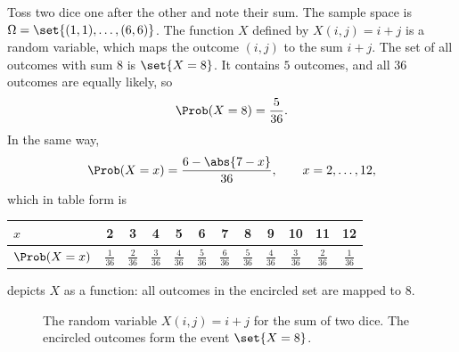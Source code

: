 \begin{example}\label{ex:sum-two-dice}
Toss two dice one after the other and note their sum. The sample space is $\Omega = \set{(1,1), \ldots, (6,6)}$. The function $X$ defined by $X(i, j) = i + j$ is a random variable, which maps the outcome $(i,j)$ to the sum $i + j$. The set of all outcomes with sum $8$ is $\set{X = 8}$. It contains $5$ outcomes, and all $36$ outcomes are equally likely, so
\[
  \Prob(X = 8) = \frac{5}{36}.
\]
In the same way,
\begin{equation}\label{eq:sum-two-dice-pmf}
  \Prob(X = x) = \frac{6 - \abs{7 - x}}{36}, \qquad x = 2, \ldots, 12,
\end{equation}
which in table form is
\begin{center}
\begin{tabular}{@{}l*{11}{c}@{}}
\toprule
$x$ & 2 & 3 & 4 & 5 & 6 & 7 & 8 & 9 & 10 & 11 & 12 \\
\midrule
$\Prob(X = x)$ & $\frac{1}{36}$ & $\frac{2}{36}$ & $\frac{3}{36}$ & $\frac{4}{36}$ & $\frac{5}{36}$ & $\frac{6}{36}$ & $\frac{5}{36}$ & $\frac{4}{36}$ & $\frac{3}{36}$ & $\frac{2}{36}$ & $\frac{1}{36}$ \\
\bottomrule
\end{tabular}
\end{center}
 depicts $X$ as a function: all outcomes in the encircled set are mapped to 8.
\end{example}

\begin{figure}[ht]
\centering
{}
\caption{The random variable $X(i,j) = i + j$ for the sum of two dice. The encircled outcomes form the event $\set{X = 8}$.}
\label{fig:rv-sum-two-dice}
\end{figure}


